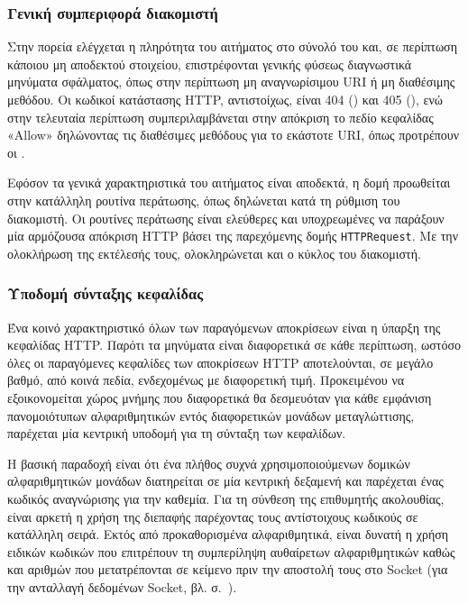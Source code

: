 
\subsubsection{Γενική συμπεριφορά διακομιστή}

Στην πορεία ελέγχεται η πληρότητα του αιτήματος στο σύνολό του και, σε περίπτωση
κάποιου μη αποδεκτού στοιχείου, επιστρέφονται γενικής φύσεως διαγνωστικά
μηνύματα σφάλματος, όπως στην περίπτωση μη αναγνωρίσιμου URI ή μη διαθέσιμης
μεθόδου. Οι κωδικοί κατάστασης HTTP, αντιστοίχως, είναι 404 () και
405 (), ενώ στην τελευταία περίπτωση συμπεριλαμβάνεται
στην απόκριση το πεδίο κεφαλίδας «Allow» δηλώνοντας τις διαθέσιμες μεθόδους για
το εκάστοτε URI, όπως προτρέπουν οι \textcite[66]{rfc2616}.

Εφόσον τα γενικά χαρακτηριστικά του αιτήματος είναι αποδεκτά, η δομή προωθείται
στην κατάλληλη ρουτίνα περάτωσης, όπως δηλώνεται κατά τη ρύθμιση του διακομιστή.
Οι ρουτίνες περάτωσης είναι ελεύθερες και υποχρεωμένες να παράξουν μία
αρμόζουσα απόκριση HTTP βάσει της παρεχόμενης δομής \verb~HTTPRequest~.
Με την ολοκλήρωση της εκτέλεσής τους, ολοκληρώνεται και ο κύκλος του διακομιστή.


\subsubsection{Υποδομή σύνταξης κεφαλίδας}
\label{ssubsec:network:header-compile}

Ένα κοινό χαρακτηριστικό όλων των παραγόμενων αποκρίσεων είναι η ύπαρξη της
κεφαλίδας HTTP. Παρότι τα μηνύματα είναι διαφορετικά σε κάθε περίπτωση, ωστόσο
όλες οι παραγόμενες κεφαλίδες των αποκρίσεων HTTP αποτελούνται, σε μεγάλο βαθμό,
από κοινά πεδία, ενδεχομένως με διαφορετική τιμή. Προκειμένου να εξοικονομείται
χώρος μνήμης που διαφορετικά θα δεσμευόταν για κάθε εμφάνιση πανομοιότυπων
αλφαριθμητικών εντός διαφορετικών μονάδων μεταγλώττισης, παρέχεται μία κεντρική
υποδομή για τη σύνταξη των κεφαλίδων.

Η βασική παραδοχή είναι ότι ένα πλήθος συχνά χρησιμοποιούμενων δομικών
αλφαριθμητικών μονάδων διατηρείται σε μία κεντρική δεξαμενή και παρέχεται ένας
κωδικός αναγνώρισης για την καθεμία. Για τη σύνθεση της επιθυμητής ακολουθίας,
είναι αρκετή η χρήση της διεπαφής παρέχοντας τους αντίστοιχους κωδικούς σε
κατάλληλη σειρά. Εκτός από προκαθορισμένα αλφαριθμητικά, είναι δυνατή η χρήση
ειδικών κωδικών που επιτρέπουν τη συμπερίληψη αυθαίρετων αλφαριθμητικών καθώς
και αριθμών που μετατρέπονται σε κείμενο πριν την αποστολή τους στο Socket
(για την ανταλλαγή δεδομένων Socket, βλ. 
σ.~\pageref{ssubsec:network:rx-tx-buffer}).

